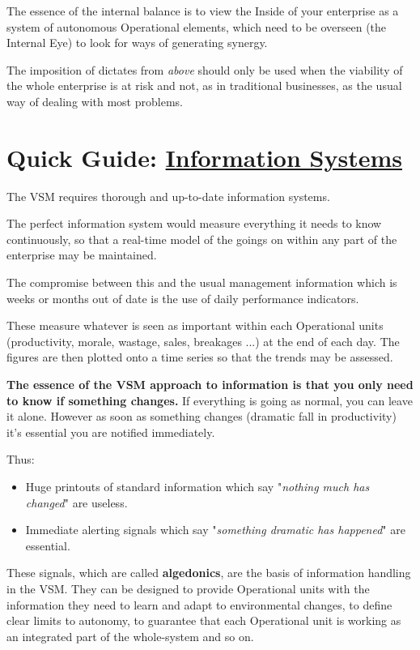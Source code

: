 The essence of the internal balance is to view the Inside of your enterprise as a system of autonomous Operational elements, which need to be overseen (the Internal Eye) to look for ways of generating synergy.

The imposition of dictates from \textit{above} should only be used when the viability of the whole enterprise is at risk and not, as in traditional businesses, as the usual way of dealing with most problems.

\section*{Quick Guide: \href{https://vsmg.lrc.org.uk/6infsys.html}{Information Systems}}
The VSM requires thorough and up-to-date information systems.

The perfect information system would measure everything it needs to know continuously, so that a real-time model of the goings on within any part of the enterprise may be maintained.

The compromise between this and the usual management information which is weeks or months out of date is the use of daily performance indicators.

These measure whatever is seen as important within each Operational units (productivity, morale, wastage, sales, breakages ...) at the end of each day. The figures are then plotted onto a time series so that the trends may be assessed.

\textbf{The essence of the VSM approach to information is that you only need to know if something changes.} If everything is going as normal, you can leave it alone. However as soon as something changes (dramatic fall in productivity) it's essential you are notified immediately.

Thus:

\begin{itemize}
  \item Huge printouts of standard information which say "\textit{nothing much has changed}" are useless.

  \item Immediate alerting signals which say "\textit{something dramatic has happened}" are essential.

\end{itemize}

These signals, which are called \textbf{algedonics}, are the basis of information handling in the VSM. They can be designed to provide Operational units with the information they need to learn and adapt to environmental changes, to define clear limits to autonomy, to guarantee that each Operational unit is working as an integrated part of the whole-system and so on.

